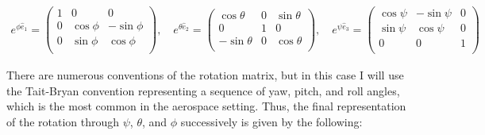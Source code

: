 \documentclass{article}
\begin{document}
\newcommand{\Rx}{
    \begin{pmatrix}
        1 & 0 & 0 \\
        0 & \cos{\phi} & -\sin{\phi} \\
        0 & \sin{\phi} & \cos{\phi} \\
    \end{pmatrix}}
\newcommand{\Ry}{
    \begin{pmatrix}
        \cos{\theta} & 0 & \sin{\theta} \\
        0 & 1 & 0 \\
        -\sin{\theta} & 0 & \cos{\theta} \\
    \end{pmatrix}}
\newcommand{\Rz}{
    \begin{pmatrix}
        \cos{\psi} & -\sin{\psi} & 0 \\
        \sin{\psi} & \cos{\psi} & 0 \\
        0 & 0 & 1 \\
    \end{pmatrix}}

\newcommand{\e}[1]{\exp \left( #1 \right)}

\begin{gather*}
    e^{\phi \hat{e}_1} = \Rx, \quad 
    e^{\theta \hat{e}_2} = \Ry, \quad 
    e^{\psi \hat{e}_3} = \Rz
\end{gather*}

There are numerous conventions of the rotation matrix, but in this case I will use the Tait-Bryan convention representing a sequence of yaw, pitch, and roll angles, which is the most common in the aerospace setting. Thus, the final representation of the rotation through $\psi$, $\theta$, and $\phi$ successively is given by the following:
\end{document}
